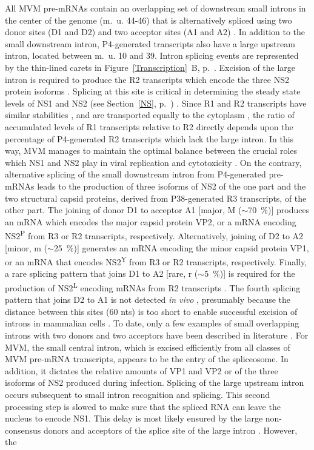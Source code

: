 All MVM pre-mRNAs contain an overlapping set of downstream small introns in the center of the genome (m.~u. 44-46) that is alternatively spliced using two donor sites (D1 and D2) and two acceptor sites (A1 and A2) \cite{pmid2942705, pmid3783817, pmid2164605, pmid2142555}. In addition to the small downstream intron, P4-generated transcripts also have a large upstream intron, located between m.~u. 10 and 39. Intron splicing events are represented by the thin-lined carets in Figure~\ref{Transcription}~B, p.~\pageref{Transcription}. Excision of the large intron is required to produce the R2 transcripts which encode the three NS2 protein isoforms \cite{pmid6623929, pmid6828378, pmid2942705}. Splicing at this site is critical in determining the steady state levels of NS1 and NS2 (see Section~\ref{NS}, p.~\pageref{NS}) \cite{pmid1825251, pmid2142555}. Since R1 and R2 transcripts have similar stabilities \cite{pmid1825251}, and are transported equally to the cytoplasm \cite{pmid1592259}, the ratio of accumulated levels of R1 transcripts relative to R2 directly depends upon the percentage of P4-generated R2 transcripts which lack the large intron. In this way, MVM manages to maintain the optimal balance between the crucial roles which NS1 and NS2 play in viral replication and cytotoxicity \cite{pmid3296697}. On the contrary, alternative splicing of the small downstream intron from P4-generated pre-mRNAs leads to the production of three isoforms of NS2 \cite{pmid3783817, pmid2142555, pmid2164605} of the one part and the two structural capsid proteins, derived from P38-generated R3 transcripts, of the other part. The joining of donor D1 to acceptor A1 [major, M ($\sim$70~\%)] produces an mRNA which encodes the major capsid protein VP2, or a mRNA encoding NS2\textsuperscript{P} from R3 or R2 transcripts, respectively. Alternatively, joining of D2 to A2 [minor, m ($\sim$25~\%)] generates an mRNA encoding the minor capsid protein VP1, or an mRNA that encodes NS2\textsuperscript{Y} from R3 or R2 transcripts, respectively. Finally, a rare splicing pattern that joins D1 to A2 [rare, r ($\sim$5~\%)] is required for the production of NS2\textsuperscript{L} encoding mRNAs from R2 transcripts \cite{pmid3502703, pmid2942705, pmid3783817, pmid3951017}. The fourth splicing pattern that joins D2 to A1 is not detected \textit{in vivo} \cite{pmid3783817}, presumably because the distance between this sites (60 nts) is too short to enable successful excision of introns in mammalian cells \cite{pmid2943217}. To date, only a few examples of small overlapping introns with two donors and two acceptors have been described in literature \cite{pmid1335742, pmid1824726, pmid1839712}. For MVM, the small central intron, which is excised efficiently from all classes of MVM pre-mRNA transcripts, appears to be the entry of the spliceosome. In addition, it dictates the relative amounts of VP1 and VP2 or of the three isoforms of NS2 produced during infection. Splicing of the large upstream intron occurs subsequent to small intron recognition and splicing. This second processing step is slowed to make sure that the spliced RNA can leave the nucleus to encode NS1. This delay is most likely ensured by the large non-consensus donors and acceptors of the splice site of the large intron \cite{Transcription}. However, the 